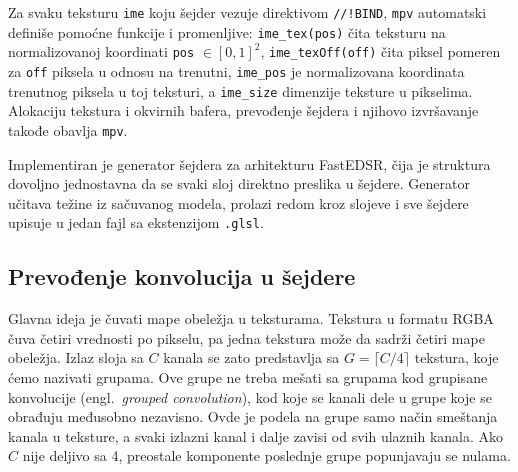 \documentclass[12pt,a4paper]{article}
\begin{document}
Za svaku teksturu \texttt{ime} koju šejder vezuje direktivom \texttt{//!BIND}, \texttt{mpv} automatski definiše pomoćne funkcije i promenljive: \texttt{ime\_tex(pos)} čita teksturu na normalizovanoj koordinati \texttt{pos} $\in[0,1]^2$, \texttt{ime\_texOff(off)} čita piksel pomeren za \texttt{off} piksela u odnosu na trenutni, \texttt{ime\_pos} je normalizovana koordinata trenutnog piksela u toj teksturi, a \texttt{ime\_size} dimenzije teksture u pikselima. Alokaciju tekstura i okvirnih bafera, prevođenje šejdera i njihovo izvršavanje takođe obavlja \texttt{mpv}.

Implementiran je generator šejdera za arhitekturu FastEDSR, čija je struktura dovoljno jednostavna da se svaki sloj direktno preslika u šejdere. Generator učitava težine iz sačuvanog modela, prolazi redom kroz slojeve i sve šejdere upisuje u jedan fajl sa ekstenzijom \texttt{.glsl}.

\subsection{Prevođenje konvolucija u šejdere}
\label{sec:gl_konvolucije}

Glavna ideja je čuvati mape obeležja u teksturama. Tekstura u formatu RGBA čuva četiri vrednosti po pikselu, pa jedna tekstura može da sadrži četiri mape obeležja. Izlaz sloja sa $C$ kanala se zato predstavlja sa $G = \lceil C/4 \rceil$ tekstura, koje ćemo nazivati grupama. Ove grupe ne treba mešati sa grupama kod grupisane konvolucije (engl.\ \textit{grouped convolution}), kod koje se kanali dele u grupe koje se obrađuju međusobno nezavisno. Ovde je podela na grupe samo način smeštanja kanala u teksture, a svaki izlazni kanal i dalje zavisi od svih ulaznih kanala. Ako $C$ nije deljivo sa 4, preostale komponente poslednje grupe popunjavaju se nulama.
\end{document}
